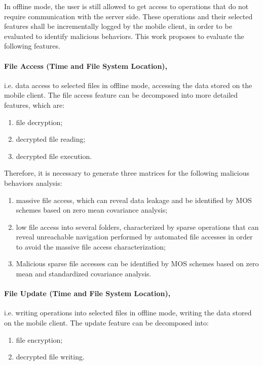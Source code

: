 \documentclass[twocolumn]{svjour3}          	%
\begin{document}
In offline mode, the user is still allowed to get access to operations that do not require communication with the server side. These operations and their selected features shall be incrementally logged by the mobile client, in order to be evaluated to identify malicious behaviors. This work proposes to evaluate the following features.

\paragraph{\textbf{File Access (Time and File System Location)},}i.e. data access to selected files in offline mode, accessing the data stored on the mobile client. The file access feature can be decomposed into more detailed features, which are:

\begin{enumerate}
	\item file decryption; 
	\item decrypted file reading;
	\item decrypted file execution. 
\end{enumerate}

Therefore, it is necessary to generate three matrices for the following malicious behaviors analysis: 

\begin{enumerate}[label=(\alph*)]
	\item massive file access, which can reveal data leakage and be identified by MOS schemes based on zero mean covariance analysis; 
	\item low file access into several folders, characterized by sparse operations that can reveal unreachable navigation performed by automated file accesses in order to avoid the massive file access characterization;
	\item Malicious sparse file accesses can be identified by MOS schemes based on zero mean and standardized covariance analysis. 
\end{enumerate}

\paragraph{\textbf{File Update (Time and File System Location)},}i.e. writing operations into selected files in offline mode, writing the data stored on the mobile client. The update feature can be decomposed into:

\begin{enumerate}
	\item file encryption;
	\item decrypted file writing.
\end{enumerate}
\end{document}
